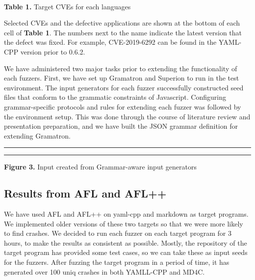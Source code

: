\documentclass[12pt]{diazessay}
\begin{document}
\begin{table}[h!]
{\begin{tabular}{V{4}l|l|lV{4}}
\end{tabular}
}
\vspace{6mm}\\ \textbf{Table 1.} Target CVEs for each languages
\end{table}
\vspace{6mm}

Selected CVEs and the defective applications are shown at the bottom of each cell of \textbf{Table 1}. The numbers next to the name indicate the latest version that the defect was fixed. For example, CVE-2019-6292 can be found in the YAML-CPP version prior to 0.6.2.


We have administered two major tasks prior to extending the functionality of each fuzzers.
First, we have set up Gramatron and Superion to run in the test environment.
The input generators for each fuzzer successfully constructed seed files \cite{superion-example}\cite{gramatron-example}that conform to the grammatic constraints of Javascript.
Configuring grammar-specific protocols and rules for extending each fuzzer was followed by the environment setup.
This was done through the course of literature review and presentation preparation, and we have built the JSON grammar definition\cite{json-source.json} for extending Gramatron.

\vspace{22mm}
\hrule height 0.4mm
\begingroup \fontsize{12pt}{12pt} \selectfont \begin{alltt}

\end{alltt} \vspace{-6mm} \endgroup \hrule height 0.4mm
\vspace{6mm}
\centerline{\textbf{Figure 3.} Input created from Grammar-aware input generators}
\vspace{6mm}

\subsection*{Results from AFL and AFL++}
We have used AFL and AFL++ on yaml-cpp and markdown as target programs. We implemented older versions of these two targets so that we were more likely to find crashes. We decided to run each fuzzer on each target program for 3 hours, to make the results as consistent as possible.
Mostly, the repository of the target program has provided some test cases, so we can take these as input seeds for the fuzzers.
After fuzzing the target program in a period of time, it has generated over 100 uniq crashes in both YAMLL-CPP and MD4C. 
\end{document}
